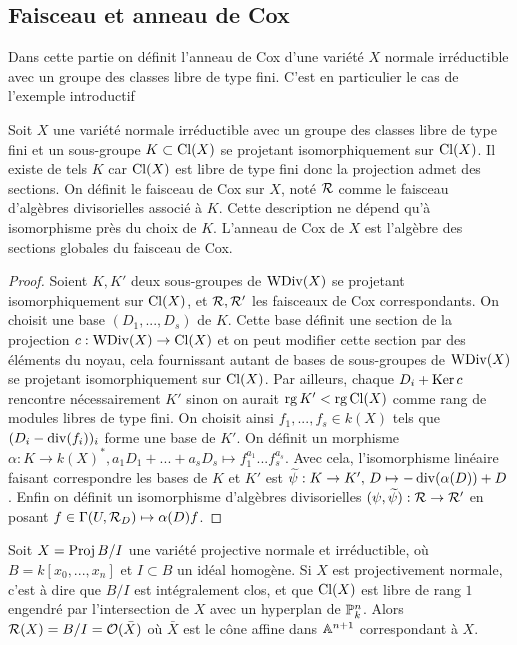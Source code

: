 \subsection{Faisceau et anneau de Cox}

Dans cette partie on définit l'anneau de Cox d'une variété $X$ normale irréductible avec un groupe des classes libre de type fini. C'est en particulier le cas de l'exemple introductif

\begin{cons}\label{consFreeCoxRing}
Soit $X$ une variété normale irréductible avec un groupe des classes libre de type fini et un sous-groupe $K\subset \operatorname{Cl}(X)$ se projetant isomorphiquement sur $\operatorname{Cl}(X)$. Il existe de tels $K$ car $\operatorname{Cl}(X)$ est libre de type fini donc la projection admet des sections. On définit le faisceau de Cox sur $X$, noté $\mathcal{R}$ comme le faisceau d'algèbres divisorielles associé à $K$. Cette description ne dépend qu'à isomorphisme près du choix de $K$. L'anneau de Cox de $X$ est l'algèbre des sections globales du faisceau de Cox. 
\end{cons}
\begin{proof}
Soient $K,K'$ deux sous-groupes de $\operatorname{WDiv}(X)$ se projetant isomorphiquement sur $\operatorname{Cl}(X)$, et $\mathcal{R},\mathcal{R}'$ les faisceaux de Cox correspondants. On choisit une base $(D_1,...,D_s)$ de $K$. Cette base définit une section de la projection $c:\operatorname{WDiv}(X)\rightarrow \operatorname{Cl}(X)$ et on peut modifier cette section par des éléments du noyau, cela fournissant autant de bases de sous-groupes de $\operatorname{WDiv}(X)$ se projetant isomorphiquement sur $\operatorname{Cl}(X)$. Par ailleurs, chaque $D_i+\operatorname{Ker} c$ rencontre nécessairement $K'$ sinon on aurait $\operatorname{rg} K' < \operatorname{rg} \operatorname{Cl}(X)$ comme rang de modules libres de type fini. On choisit ainsi $f_1,...,f_s\in k(X)$ tels que $(D_i-\operatorname{div}(f_i))_i$ forme une base de $K'$. On définit un morphisme $\alpha:K\rightarrow k(X)^*, a_1D_1+...+a_sD_s\mapsto f_1^{a_1}...f_s^{a_s}$. Avec cela, l'isomorphisme linéaire faisant correspondre les bases de $K$ et $K'$ est $\widetilde{\psi}:K\rightarrow K',\, D\mapsto -\operatorname{div}(\alpha(D))+D$. Enfin on définit un isomorphisme d'algèbres divisorielles $(\psi, \widetilde{\psi}): \mathcal{R}\rightarrow\mathcal{R}'$ en posant $f\in \Gamma(U, \mathcal{R}_D)\mapsto \alpha(D)f$.
\end{proof}

\begin{ex}
Soit $X=\operatorname{Proj} B/I$ une variété projective normale et irréductible, où $B=k[x_0,...,x_n]$ et $I\subset B$ un idéal homogène. Si $X$ est projectivement normale, c'est à dire que $B/I$ est intégralement clos, et que $\operatorname{Cl}(X)$ est libre de rang $1$ engendré par l'intersection de $X$ avec un hyperplan de $\mathbb{P}^n_k$. Alors $\mathcal{R}(X)=B/I=\mathcal{O}(\bar{X})$ où $\bar{X}$ est le cône affine dans $\mathbb{A}^{n+1}$ correspondant à $X$.
\end{ex}

